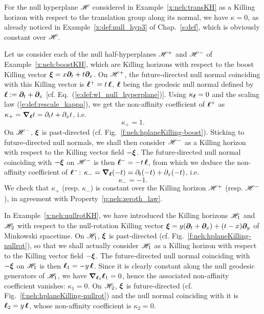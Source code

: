 \begin{example}
\label{x:neh:transKH_kappa}
For the null hyperplane $\mathscr{H}$ considered in Example~\ref{x:neh:transKH} as a Killing horizon with respect to the translation group along its normal, we have
$\kappa = 0$, as already noticed in Example~\ref{x:def:null_hyp3} of Chap.~\ref{s:def},
which is obviously constant over $\mathscr{H}$.
\end{example}

\begin{example}
\label{x:neh:boostKH_kappa}
Let us consider each of the null half-hyperplanes $\mathscr{H}^+$
and $\mathscr{H}^-$ of Example~\ref{x:neh:boostKH}, which are Killing horizons with
respect to the boost Killing vector $\bm{\xi} = x \bm{\partial}_t + t \bm{\partial}_x$. On
$\mathscr{H}^+$, the future-directed null normal coinciding with this Killing vector
is $\bm{\ell}^+ = t\,  \bm{\ell}$, $\bm{\ell}$ being the geodesic null normal defined by
$\bm{\ell}:= \bm{\partial}_t + \bm{\partial}_x$ [cf. Eq.~(\ref{e:def:wl_null_hyperplane})].
Using $\kappa_{\bm{\ell}} = 0$ and the scaling law (\ref{e:def:rescale_kappa}),
we get the non-affinity
coefficient of $\bm{\ell}^+$ as $\kappa_+= \bm{\nabla}_{\bm{\ell}} t = \partial_t t + \partial_x t$, i.e.
\[
    \kappa_+ = 1 .
\]
On $\mathscr{H}^-$, $\bm{\xi}$ is past-directed (cf. Fig.~\ref{f:neh:hplaneKilling-boost}).
Sticking to future-directed null normals, we shall then consider $\mathscr{H}^-$
as a Killing horizon with respect to the Killing vector field $-\bm{\xi}$.
The future-directed null normal coinciding with $-\bm{\xi}$ on $\mathscr{H}^-$ is then
$\bm{\ell}^- = -t\,  \bm{\ell}$, from which we deduce the non-affinity
coefficient of $\bm{\ell}^-$: $\kappa_-= \bm{\nabla}_{\bm{\ell}} (-t) = \partial_t (-t) + \partial_x (-t)$, i.e.
\[
    \kappa_- = -1 .
\]
We check that $\kappa_+$ (resp.  $\kappa_-$) is constant over the Killing horizon $\mathscr{H}^+$ (resp. $\mathscr{H}^-$), in agreement with Property~\ref{p:neh:zeroth_law}.
\end{example}

\begin{example}
\label{x:neh:nullrotKH_kappa}
In Example~\ref{x:neh:nullrotKH}, we have introduced the Killing horizons
$\mathscr{H}_1$ and $\mathscr{H}_2$ with respect to the null-rotation Killing vector
$\bm{\xi} = y( \bm{\partial}_t + \bm{\partial}_x ) + (t-x)\bm{\partial}_y$ of Minkowski spacetime.
On $\mathscr{H}_1$, $\bm{\xi}$ is past-directed (cf. Fig.~\ref{f:neh:hplaneKilling-nullrot}),
so that we shall actually consider $\mathscr{H}_1$
as a Killing horizon with respect to the Killing vector field $-\bm{\xi}$.
The future-directed null normal coinciding with $-\bm{\xi}$ on $\mathscr{H}_1$ is then
$\bm{\ell}_1 = - y\, \bm{\ell}$. Since it is clearly constant along the null geodesic generators
of $\mathscr{H}_1$, we have $\bm{\nabla}_{\bm{\ell}_1}\bm{\ell}_1 = 0$, hence the
associated non-affinity coefficient vanishes: $\kappa_1 = 0$.
On $\mathscr{H}_2$, $\bm{\xi}$ is future-directed (cf. Fig.~\ref{f:neh:hplaneKilling-nullrot})
and the null normal coinciding with it is $\bm{\ell}_2 =  y\,  \bm{\ell}$, whose non-affinity
coefficient is $\kappa_2 = 0$.
\end{example}

